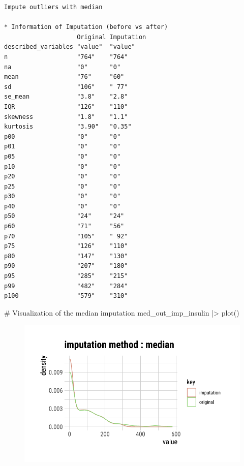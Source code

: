 \documentclass[
  letterpaper,
  DIV=11,
  numbers=noendperiod]{scrreprt}
\newenvironment{Shaded}{\begin{snugshade}}{\end{snugshade}}
\newcommand{\CommentTok}[1]{\textcolor[rgb]{0.37,0.37,0.37}{#1}}
\newcommand{\FunctionTok}[1]{\textcolor[rgb]{0.28,0.35,0.67}{#1}}
\newcommand{\NormalTok}[1]{\textcolor[rgb]{0.00,0.23,0.31}{#1}}
\newcommand{\SpecialCharTok}[1]{\textcolor[rgb]{0.37,0.37,0.37}{#1}}
\begin{document}
\begin{verbatim}
Impute outliers with median

* Information of Imputation (before vs after)
                    Original Imputation
described_variables "value"  "value"   
n                   "764"    "764"     
na                  "0"      "0"       
mean                "76"     "60"      
sd                  "106"    " 77"     
se_mean             "3.8"    "2.8"     
IQR                 "126"    "110"     
skewness            "1.8"    "1.1"     
kurtosis            "3.90"   "0.35"    
p00                 "0"      "0"       
p01                 "0"      "0"       
p05                 "0"      "0"       
p10                 "0"      "0"       
p20                 "0"      "0"       
p25                 "0"      "0"       
p30                 "0"      "0"       
p40                 "0"      "0"       
p50                 "24"     "24"      
p60                 "71"     "56"      
p70                 "105"    " 92"     
p75                 "126"    "110"     
p80                 "147"    "130"     
p90                 "207"    "180"     
p95                 "285"    "215"     
p99                 "482"    "284"     
p100                "579"    "310"     
\end{verbatim}

\begin{Shaded}
\begin{Highlighting}[]
\CommentTok{\# Visualization of the median imputation}
\NormalTok{med\_out\_imp\_insulin }\SpecialCharTok{|\textgreater{}}
  \FunctionTok{plot}\NormalTok{()}
\end{Highlighting}
\end{Shaded}

\begin{figure}[H]

{\centering \includegraphics{./ImputatingLikeDataScientist_files/figure-pdf/unnamed-chunk-14-1.pdf}

}

\end{figure}
\end{document}
